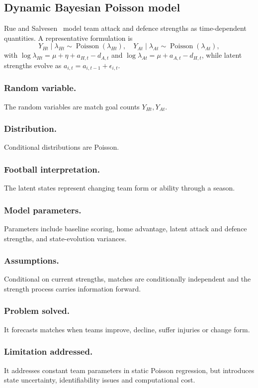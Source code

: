 \documentclass[11pt,a4paper]{amsart}
\numberwithin{equation}{section}
\begin{document}
\subsection{Dynamic Bayesian Poisson model}
Rue and Salvesen~\cite{ruesalvesen2000} model team attack and defence strengths as time-dependent quantities. A representative formulation is
\begin{equation}Y_{Ht}\mid\lambda_{Ht}\sim\operatorname{Poisson}(\lambda_{Ht}),\quad Y_{At}\mid\lambda_{At}\sim\operatorname{Poisson}(\lambda_{At}),\end{equation}
with $\log\lambda_{Ht}=\mu+\eta+a_{H,t}-d_{A,t}$ and $\log\lambda_{At}=\mu+a_{A,t}-d_{H,t}$, while latent strengths evolve as $a_{i,t}=a_{i,t-1}+\epsilon_{i,t}$.

\subsubsection*{Random variable.} The random variables are match goal counts $Y_{Ht},Y_{At}$.
\subsubsection*{Distribution.} Conditional distributions are Poisson.
\subsubsection*{Football interpretation.} The latent states represent changing team form or ability through a season.
\subsubsection*{Model parameters.} Parameters include baseline scoring, home advantage, latent attack and defence strengths, and state-evolution variances.
\subsubsection*{Assumptions.} Conditional on current strengths, matches are conditionally independent and the strength process carries information forward.
\subsubsection*{Problem solved.} It forecasts matches when teams improve, decline, suffer injuries or change form.
\subsubsection*{Limitation addressed.} It addresses constant team parameters in static Poisson regression, but introduces state uncertainty, identifiability issues and computational cost.
\end{document}

